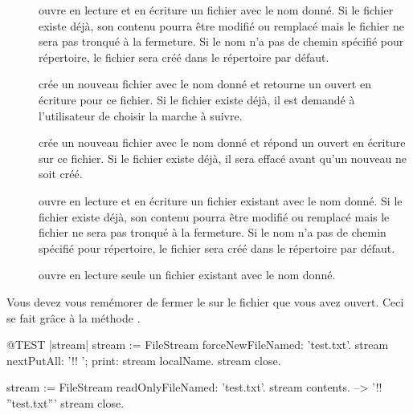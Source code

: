 \documentclass[a4paper,10pt,twoside]{book}
\begin{document}
\begin{description}

\item[] ouvre en lecture et en \'ecriture un fichier 
  avec le nom donn\'e. Si le fichier existe d\'ej\`a, son contenu pourra
  \^etre modifi\'e ou remplac\'e mais le fichier ne sera pas tronqu\'e
  \`a la fermeture. Si le nom n'a pas de chemin sp\'ecifi\'e pour r\'epertoire,
  le fichier sera cr\'e\'e dans le r\'epertoire par d\'efaut.
  
\item[] cr\'ee un nouveau fichier avec le nom donn\'e
	et retourne un \stream ouvert en \'ecriture pour ce fichier.
	Si le fichier existe d\'ej\`a, il est demand\'e \`a l'utilisateur
	de choisir la marche \`a suivre.
  
\item[] cr\'ee un nouveau fichier avec le nom donn\'e
	et r\'epond un \stream ouvert en \'ecriture sur ce fichier.
	Si le fichier existe d\'ej\`a, il sera effac\'e avant qu'un nouveau
	ne soit cr\'e\'e.

\item[] ouvre en lecture et en \'ecriture un fichier 
	existant avec le nom donn\'e. Si le fichier existe d\'ej\`a, son 
	contenu pourra \^etre modifi\'e ou remplac\'e mais le fichier ne sera
	pas tronqu\'e \`a la fermeture. Si le nom n'a pas de chemin sp\'ecifi\'e
	pour r\'epertoire, le fichier sera cr\'e\'e dans le r\'epertoire par
	d\'efaut.

\item[] ouvre en lecture seule un fichier 
	existant avec le nom donn\'e.

\end{description}

Vous devez vous rem\'emorer de fermer le \stream sur le fichier que vous avez ouvert. Ceci se fait gr\^ace \`a la m\'ethode .

\begin{code}{@TEST |stream|}
stream := FileStream forceNewFileNamed: 'test.txt'.
stream
    nextPutAll: '!! ';
    print: stream localName.
stream close.

stream := FileStream readOnlyFileNamed: 'test.txt'.
stream contents. --> '!! ''test.txt'''
stream close.
\end{code}
\end{document}
